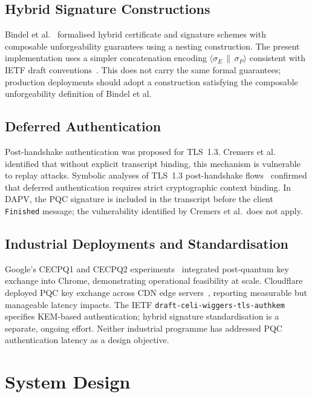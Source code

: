 \documentclass[preprint,10pt,3p]{elsarticle}
\begin{document}
\subsection{Hybrid Signature Constructions}

Bindel et al.~\cite{Bindel2017} formalised hybrid certificate and signature
schemes with composable unforgeability guarantees using a nesting construction.
The present implementation uses a simpler concatenation encoding
$\langle\sigma_E\,\|\,\sigma_P\rangle$ consistent with IETF draft
conventions~\cite{WiggersIETF2024}.  This does not carry the same formal
guarantees; production deployments should adopt a construction satisfying the
composable unforgeability definition of Bindel et al.

\subsection{Deferred Authentication}

Post-handshake authentication was proposed for TLS~1.3.  Cremers et
al.~\cite{Cremers2016} identified that without explicit transcript binding, this
mechanism is vulnerable to replay attacks.  Symbolic analyses of TLS~1.3
post-handshake flows~\cite{Cheval2022} confirmed that deferred authentication
requires strict cryptographic context binding.  In DAPV, the PQC signature is
included in the transcript before the client \texttt{Finished} message; the
vulnerability identified by Cremers et al.\ does not apply.

\subsection{Industrial Deployments and Standardisation}

Google's CECPQ1 and CECPQ2 experiments~\cite{Langley2016CECPQ1,
Langley2018CECPQ2,Braithwaite2016} integrated post-quantum key exchange into
Chrome, demonstrating operational feasibility at scale.  Cloudflare deployed
PQC key exchange across CDN edge servers~\cite{Kwiatkowski2019}, reporting
measurable but manageable latency impacts.  The IETF
\texttt{draft-celi-wiggers-tls-authkem}~\cite{WiggersIETF2024} specifies
KEM-based authentication; hybrid signature standardisation is a separate,
ongoing effort.  Neither industrial programme has addressed PQC authentication
latency as a design objective.

\section{System Design}
\label{sec:design}
\end{document}
